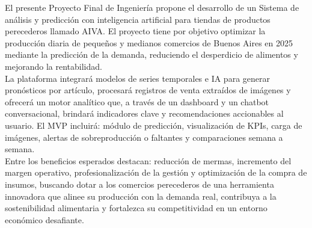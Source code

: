 \begin{Resumen} %

    \indent El presente Proyecto Final de Ingeniería propone el desarrollo de un Sistema de análisis y predicción con inteligencia artificial para tiendas de productos perecederos llamado AIVA. El proyecto tiene por objetivo optimizar la producción diaria de pequeños y medianos comercios de Buenos Aires en 2025 mediante la predicción de la demanda, reduciendo el desperdicio de alimentos y mejorando la rentabilidad.\\

    \indent La plataforma integrará modelos de series temporales e IA para generar pronósticos por artículo, procesará registros de venta extraídos de imágenes y ofrecerá un motor analítico que, a través de un dashboard y un chatbot conversacional, brindará indicadores clave y recomendaciones accionables al usuario. El MVP incluirá: módulo de predicción, visualización de KPIs, carga de imágenes, alertas de sobreproducción o faltantes y comparaciones semana a semana.\\

    \indent Entre los beneficios esperados destacan: reducción de mermas, incremento del margen operativo, profesionalización de la gestión y optimización de la compra de insumos, buscando dotar a los comercios perecederos de una herramienta innovadora que alinee su producción con la demanda real, contribuya a la sostenibilidad alimentaria y fortalezca su competitividad en un entorno económico desafiante.

\end{Resumen}

